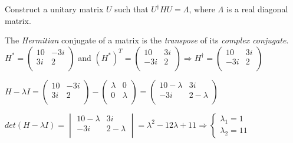 \documentclass[fleqn]{article}
\begin{document}
\begin{enumerate}
      Construct a unitary matrix $U$ such that $U^\dagger HU=\Lambda$, where $\Lambda$ is a real  diagonal matrix.
      
      \bigbreak

      \textcolor{hwColor}{
        The \emph{Hermitian} conjugate of a matrix is the \emph{transpose} of its \emph{complex conjugate}. \\
        $
          H^*=\begin{pmatrix}
            10 & -3i \\
            3i & 2 \\
          \end{pmatrix}
        $ and 
        $
          (H^*)^T=\begin{pmatrix}
            10 & 3i \\
            -3i & 2 \\
          \end{pmatrix}
          \Longrightarrow
          H^\dagger=\begin{pmatrix}
            10 & 3i \\
            -3i & 2 \\
          \end{pmatrix}
        $
      }

      \textcolor{hwColor}{
        $
          H-\lambda I=\begin{pmatrix}
            10 & -3i \\
            3i & 2 \\
          \end{pmatrix}-\begin{pmatrix}
            \lambda & 0 \\
            0 & \lambda \\
          \end{pmatrix}=\begin{pmatrix}
            10-\lambda & 3i \\
            -3i & 2-\lambda \\
          \end{pmatrix}
        $
      }

      \textcolor{hwColor}{
        $
         det(H-\lambda I)=\begin{vmatrix}
          10-\lambda & 3i \\
          -3i & 2-\lambda \\
         \end{vmatrix}=\lambda^2-12\lambda+11 \Longrightarrow 
         \begin{cases}
           \lambda_1=1 \\
           \lambda_2=11
         \end{cases}
        $
      }


\end{enumerate}
\end{document}

